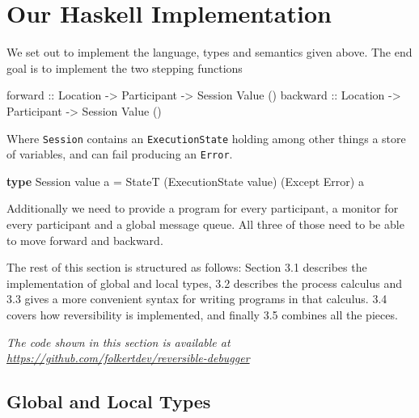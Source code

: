 \documentclass[runningheads]{llncs}
\newenvironment{Shaded}{}{}
\newcommand{\KeywordTok}[1]{\textcolor[rgb]{0.00,0.44,0.13}{\textbf{#1}}}
\newcommand{\DataTypeTok}[1]{\textcolor[rgb]{0.56,0.13,0.00}{#1}}
\newcommand{\OtherTok}[1]{\textcolor[rgb]{0.00,0.44,0.13}{#1}}
\newcommand{\FunctionTok}[1]{\textcolor[rgb]{0.02,0.16,0.49}{#1}}
\newcommand{\NormalTok}[1]{#1}
\begin{document}
\section{Our Haskell Implementation}\label{our-haskell-implementation}

We set out to implement the language, types and semantics given above.
The end goal is to implement the two stepping functions

\begin{Shaded}
\begin{Highlighting}[]
\OtherTok{forward ::} \DataTypeTok{Location} \OtherTok{->} \DataTypeTok{Participant} \OtherTok{->} \DataTypeTok{Session} \DataTypeTok{Value}\NormalTok{ ()}
\OtherTok{backward ::} \DataTypeTok{Location} \OtherTok{->} \DataTypeTok{Participant} \OtherTok{->} \DataTypeTok{Session} \DataTypeTok{Value}\NormalTok{ ()}
\end{Highlighting}
\end{Shaded}

Where \texttt{Session} contains an \texttt{ExecutionState} holding among
other things a store of variables, and can fail producing an
\texttt{Error}.

\begin{Shaded}
\begin{Highlighting}[]
\KeywordTok{type} \DataTypeTok{Session}\NormalTok{ value a }\FunctionTok{=} 
    \DataTypeTok{StateT}\NormalTok{ (}\DataTypeTok{ExecutionState}\NormalTok{ value) (}\DataTypeTok{Except} \DataTypeTok{Error}\NormalTok{) a}
\end{Highlighting}
\end{Shaded}

Additionally we need to provide a program for every participant, a
monitor for every participant and a global message queue. All three of
those need to be able to move forward and backward.

The rest of this section is structured as follows: Section 3.1 describes
the implementation of global and local types, 3.2 describes the process
calculus and 3.3 gives a more convenient syntax for writing programs in
that calculus. 3.4 covers how reversibility is implemented, and finally
3.5 combines all the pieces.

\emph{The code shown in this section is available at
\url{https://github.com/folkertdev/reversible-debugger}}

\subsection{Global and Local Types}\label{global-and-local-types}
\end{document}
